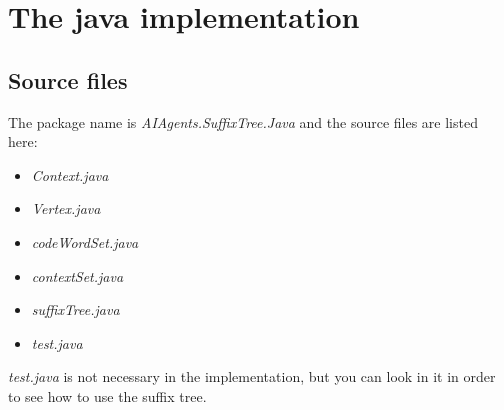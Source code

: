 \documentclass[a4paper,11pt]{report}
\begin{document}
\chapter{The java implementation}
\section{Source files}
The package name is {\sl AIAgents.SuffixTree.Java} and the source files are listed here:
\begin{itemize}
\item {\sl Context.java}
\item {\sl Vertex.java}
\item {\sl codeWordSet.java}
\item {\sl contextSet.java}
\item {\sl suffixTree.java}
\item {\sl test.java}
\end{itemize}
{\sl test.java} is not necessary in the implementation, but you can look in it in order to see how to
use the suffix tree.
\end{document}
